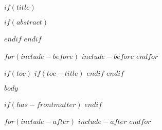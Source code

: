 \documentclass[a4paper,fleqn]{report}
\begin{document}
$if(title)$
\maketitle
$if(abstract)$
\begin{abstract}
$abstract$
\end{abstract}
$endif$
$endif$

$for(include-before)$
$include-before$
$endfor$

$if(toc)$
$if(toc-title)$
\renewcommand*\contentsname{$toc-title$}
$endif$
{
\setcounter{tocdepth}{$toc-depth$}
\tableofcontents
}
$endif$

$body$

$if(has-frontmatter)$
\backmatter
$endif$

$for(include-after)$
$include-after$
$endfor$
\end{document}
